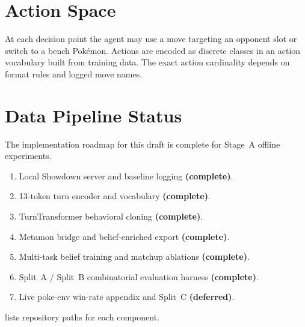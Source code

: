 \section{Action Space}

At each decision point the agent may use a move targeting an opponent slot or
switch to a bench Pok\'emon. Actions are encoded as discrete classes in an
action vocabulary built from training data. The exact action cardinality depends
on format rules and logged move names.

\section{Data Pipeline Status}

The implementation roadmap for this draft is complete for Stage~A offline
experiments.
\begin{enumerate}
  \item Local Showdown server and baseline logging \textbf{(complete)}.
  \item 13-token turn encoder and vocabulary \textbf{(complete)}.
  \item TurnTransformer behavioral cloning \textbf{(complete)}.
  \item Metamon bridge and belief-enriched export \textbf{(complete)}.
  \item Multi-task belief training and matchup ablations \textbf{(complete)}.
  \item Split~A / Split~B combinatorial evaluation harness \textbf{(complete)}.
  \item Live poke-env win-rate appendix and Split~C \textbf{(deferred)}.
\end{enumerate}

 lists repository paths for each component.

